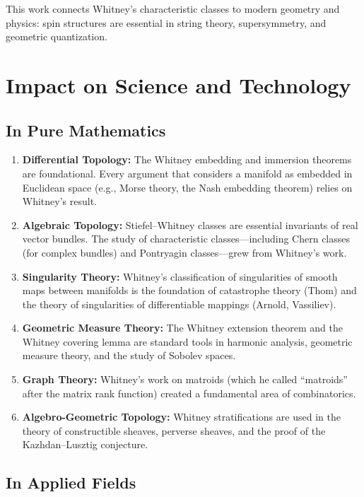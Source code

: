This work connects Whitney's characteristic classes to modern geometry and physics: spin structures are essential in string theory, supersymmetry, and geometric quantization.

\section{Impact on Science and Technology}

\subsection{In Pure Mathematics}

\begin{enumerate}
    \item \textbf{Differential Topology:} The Whitney embedding and immersion theorems are foundational. Every argument that considers a manifold as embedded in Euclidean space (e.g., Morse theory, the Nash embedding theorem) relies on Whitney's result.
    \item \textbf{Algebraic Topology:} Stiefel--Whitney classes are essential invariants of real vector bundles. The study of characteristic classes---including Chern classes (for complex bundles) and Pontryagin classes---grew from Whitney's work.
    \item \textbf{Singularity Theory:} Whitney's classification of singularities of smooth maps between manifolds is the foundation of catastrophe theory (Thom) and the theory of singularities of differentiable mappings (Arnold, Vassiliev).
    \item \textbf{Geometric Measure Theory:} The Whitney extension theorem and the Whitney covering lemma are standard tools in harmonic analysis, geometric measure theory, and the study of Sobolev spaces.
    \item \textbf{Graph Theory:} Whitney's work on matroids (which he called ``matroids'' after the matrix rank function) created a fundamental area of combinatorics.
    \item \textbf{Algebro-Geometric Topology:} Whitney stratifications are used in the theory of constructible sheaves, perverse sheaves, and the proof of the Kazhdan--Lusztig conjecture.
\end{enumerate}

\subsection{In Applied Fields}

